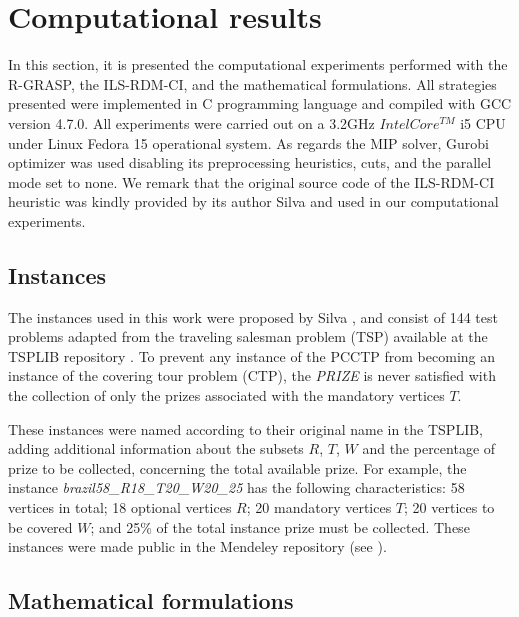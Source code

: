 \documentclass{ro}
\begin{document}
\section{Computational results}
\label{sec:results}

In this section, it is presented the computational experiments performed with the R-GRASP, the ILS-RDM-CI, and the mathematical formulations. All strategies presented were implemented in C programming language and compiled with GCC version 4.7.0. All experiments were carried out on a 3.2GHz $Intel Core^{TM}$ i5 CPU under Linux Fedora 15 operational system. As regards the MIP solver, Gurobi optimizer \cite{gurobi} was used disabling its preprocessing heuristics, cuts,
and the parallel mode set to none. We remark that the original source code of the ILS-RDM-CI heuristic was
kindly provided by its author Silva \cite{silva2009problema} and used in our computational experiments.


\subsection{Instances}

The instances used in this work were proposed by Silva \cite{silva2009problema}, and consist of 144 test problems adapted from the traveling salesman problem (TSP) available at the TSPLIB repository \cite{reinelt1991tsplib}. To prevent any instance of the PCCTP from becoming an instance of the covering tour problem (CTP), the \textit{PRIZE} is never satisfied with the collection of only the prizes associated with the mandatory vertices $T$.


These instances were named according to their original name in the TSPLIB, adding additional information about the subsets $R$, $T$, $W$ and the percentage of prize to be collected, concerning the total available prize. For example, the instance \textit{brazil58\_R18\_T20\_W20\_25} has the following characteristics: 58 vertices in total; 18 optional vertices $R$; 20 mandatory vertices $T$; 20 vertices to be covered $W$; and 25\% of the total instance prize must be collected. These instances were made public in the Mendeley repository (see \cite{pcctp-data}).



\subsection{Mathematical formulations}
\end{document}
